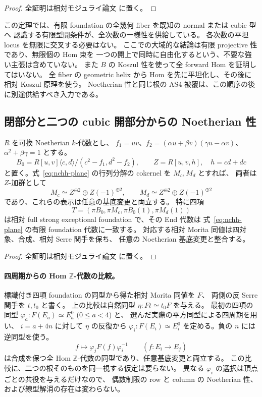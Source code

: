 \begin{proof}
全証明は相対モジュライ論文 \cite[noncubic有限型効果性]{QuadricModuli2026} に置く。
\end{proof}

\begin{remark}[有限型認識で必要な入力の順序]
この定理では、有限 foundation の全幾何 fiber を既知の normal または cubic 型へ
認識する有限型開条件が、全次数の一様性を供給している。
各次数の平坦 locus を無限に交叉する必要はない。
ここでの大域的な結論は有限 projective 性であり、無限個の Hom 束を
一つの開上で同時に自由化するという、不要な強い主張は含めていない。
また $B$ の Koszul 性を使って全 forward Hom を証明してはいない。
全 fiber の geometric helix から Hom を先に平坦化し、その後に相対 Koszul 原理を使う。
Noetherian 性と同じ根の AS4 被覆は、この順序の後に別途供給すべき入力である。
\end{remark}

\subsection{閉部分と二つの cubic 開部分からの Noetherian 性}

\begin{lemma}
\label{lem:nc-relative-normal-tilting}
$R$ を可換 Noetherian $k$-代数とし、
$f_1=uv$、$f_2=(\alpha u+\beta v)(\gamma u-\alpha v)$、
$\alpha^2+\beta\gamma=1$ とする。
\[
 B_0=R[u,v]\langle c,d\rangle/(c^2-f_1,d^2-f_2),\qquad
 Z=R[u,v,h],\quad h=cd+dc
\]
と置く。式~\ref{eq:nchh-plane} の行列分解の cokernel を $M_c,M_d$ とすれば、
両者は $Z$-加群として
\[
 M_c\simeq Z^{\oplus2}\oplus Z(-1)^{\oplus2},\qquad
 M_d\simeq Z^{\oplus2}\oplus Z(-1)^{\oplus2}
\]
であり、これらの表示は任意の基底変更と両立する。
特に四項
\[
 T=(\pi B_0,\pi M_c,\pi B_0(1),\pi M_d(1))
\]
は相対 full strong exceptional foundation で、その End 代数は
式~\ref{eq:nchh-plane} の有限 foundation 代数に一致する。
対応する相対 Morita 同値は四対象、合成、相対 Serre 関手を保ち、
任意の Noetherian 基底変更と整合する。
\end{lemma}
\begin{proof}
全証明は相対モジュライ論文 \cite[noncubic有限型効果性]{QuadricModuli2026} に置く。
\end{proof}

\paragraph{四周期からの Hom $\mathbb Z$-代数の比較。}
標識付き四項 foundation の同型から得た相対 Morita 同値を $F$、
両側の反 Serre 関手を $t,t_0$ と書く。
上の比較は自然同型 $\eta:Ft\simeq t_0F$ を与える。
最初の四項の同型 $\varphi_a:F(E_a)\simeq E_a^0$ ($0\le a<4$) と、
選んだ実際の平方同型による四周期を用い、
$i=a+4n$ に対して $\eta$ の反復から
$\varphi_i:F(E_i)\simeq E_i^0$ を定める。負の $n$ には逆同型を使う。
\[
 f\longmapsto\varphi_jF(f)\varphi_i^{-1}
 \qquad(f:E_i\longrightarrow E_j)
\]
は合成を保つ全 Hom $\mathbb Z$-代数の同型であり、任意基底変更と両立する。
この比較に、二つの根そのものを同一視する仮定は要らない。
異なる $\varphi_i$ の選択は頂点ごとの共役を与えるだけなので、
偶数制限の row と column の Noetherian 性、および線型解消の存在は変わらない。




